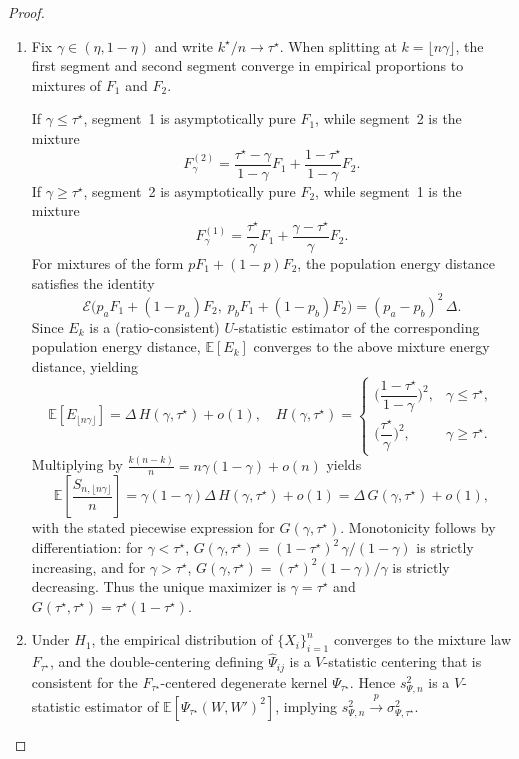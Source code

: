 \documentclass[11pt]{article}
\numberwithin{theorem}{section}
\numberwithin{Lemma}{section}
\numberwithin{Definition}{section}
\newcommand{\EE}{\mathbb{E}}
\newcommand{\cp}{k^\star}
\newcommand{\tstar}{\tau^\star}
\begin{document}
\begin{proof}\hfill

\begin{enumerate}
\item[(a)] Fix $\gamma\in(\eta,1-\eta)$ and write $\cp/n\to\tstar$.
When splitting at $k=\lfloor n\gamma\rfloor$, the first segment and second segment converge in empirical
proportions to mixtures of $F_1$ and $F_2$.

If $\gamma\le\tstar$, segment~1 is asymptotically pure $F_1$, while segment~2 is the mixture
\[
F^{(2)}_{\gamma} = \frac{\tstar-\gamma}{1-\gamma}F_1 + \frac{1-\tstar}{1-\gamma}F_2.
\]
If $\gamma\ge\tstar$, segment~2 is asymptotically pure $F_2$, while segment~1 is the mixture
\[
F^{(1)}_{\gamma} = \frac{\tstar}{\gamma}F_1 + \frac{\gamma-\tstar}{\gamma}F_2.
\]
For mixtures of the form $pF_1+(1-p)F_2$, the population energy distance satisfies the identity
\[
\mathcal{E}\big(p_aF_1+(1-p_a)F_2,\; p_bF_1+(1-p_b)F_2\big) = (p_a-p_b)^2\,\Delta.
\]
Since $E_k$ is a (ratio-consistent) $U$-statistic estimator of the corresponding population energy distance,
$\EE[E_k]$ converges to the above mixture energy distance, yielding
\[
\EE[E_{\lfloor n\gamma\rfloor}]
=
\Delta\,H(\gamma,\tstar)+o(1),
\quad
H(\gamma,\tstar)=
\begin{cases}
\big(\dfrac{1-\tstar}{1-\gamma}\big)^2, & \gamma\le\tstar,\\[1.2ex]
\big(\dfrac{\tstar}{\gamma}\big)^2, & \gamma\ge\tstar.
\end{cases}
\]
Multiplying by $\frac{k(n-k)}{n}=n\gamma(1-\gamma)+o(n)$ yields
\[
\EE\!\left[\frac{S_{n,\lfloor n\gamma\rfloor}}{n}\right]
=
\gamma(1-\gamma)\Delta\,H(\gamma,\tstar)+o(1)
=
\Delta\,G(\gamma,\tstar)+o(1),
\]
with the stated piecewise expression for $G(\gamma,\tstar)$.
Monotonicity follows by differentiation:
for $\gamma<\tstar$, $G(\gamma,\tstar)=(1-\tstar)^2\,\gamma/(1-\gamma)$ is strictly increasing,
and for $\gamma>\tstar$, $G(\gamma,\tstar)=(\tstar)^2(1-\gamma)/\gamma$ is strictly decreasing.
Thus the unique maximizer is $\gamma=\tstar$ and $G(\tstar,\tstar)=\tstar(1-\tstar)$.

\item[(b)] Under $H_1$, the empirical distribution of $\{X_i\}_{i=1}^n$ converges to the mixture law $F_{\tstar}$,
and the double-centering defining $\hat{\Psi}_{ij}$ is a $V$-statistic centering that is consistent for the
$F_{\tstar}$-centered degenerate kernel $\Psi_{\tstar}$. Hence $s_{\Psi,n}^2$ is a $V$-statistic estimator of
$\EE[\Psi_{\tstar}(W,W')^2]$, implying $s_{\Psi,n}^2 \xrightarrow{p} \sigma_{\Psi,\tstar}^2$.


\end{enumerate}
\end{proof}
\end{document}
